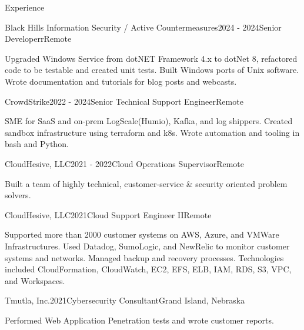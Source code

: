 \documentclass{resume} %
\begin{document}

\begin{rSection}{Experience}

\begin{rSubsection}{Black Hills Information Security / Active Countermeasures}{2024 - 2024}{Senior Developerr}{Remote}
	\item Upgraded Windows Service from dotNET Framework 4.x to dotNet 8, refactored code to be testable and created unit tests. Built Windows ports of Unix software. Wrote documentation and tutorials for blog posts and webcasts.
\end{rSubsection}

\begin{rSubsection}{CrowdStrike}{2022 - 2024}{Senior Technical Support Engineer}{Remote}
	\item SME for SaaS and on-prem LogScale(Humio), Kafka, and log shippers. Created sandbox infrastructure using terraform and k8s. Wrote automation and tooling in bash and Python.
\end{rSubsection}

\begin{rSubsection}{CloudHesive, LLC}{2021 - 2022}{Cloud Operations Supervisor}{Remote}
\item Built a team of highly technical, customer-service \& security oriented problem solvers.  
\end{rSubsection}

\begin{rSubsection}{CloudHesive, LLC}{2021}{Cloud Support Engineer II}{Remote}
\item Supported more than 2000 customer systems on AWS, Azure, and VMWare Infrastructures. Used Datadog, SumoLogic, and NewRelic to monitor customer systems and networks. Managed backup and recovery processes. Technologies included CloudFormation, CloudWatch, EC2, EFS, ELB, IAM, RDS, S3, VPC, and Workspaces.  
\end{rSubsection}

\begin{rSubsection}{Tmutla, Inc.}{2021}{Cybersecurity Consultant}{Grand Island, Nebraska}
\item Performed Web Application Penetration tests and wrote customer reports.
\end{rSubsection}


\end{rSection}
\end{document}
